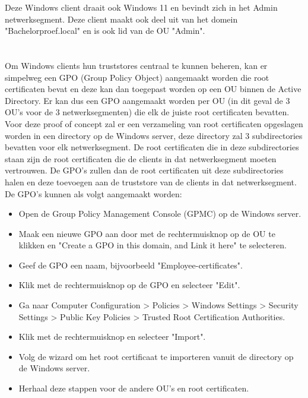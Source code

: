Deze Windows client draait ook Windows 11 en bevindt zich in het Admin netwerksegment. Deze client maakt ook deel uit van het domein "Bachelorproef.local" en is ook lid van de OU "Admin".

\section{}%
\label{sec:Eerste_oplossing}
\subsection{}
\label{subsec:Oplossing_voor_Windows_end-points_door_middel_van_GPOs_met_root_certificaten}
Om Windows clients hun truststores centraal te kunnen beheren, kan er simpelweg een GPO (Group Policy Object) aangemaakt worden die root certificaten bevat en deze kan dan toegepast worden op een OU binnen de Active Directory.
Er kan dus een GPO aangemaakt worden per OU (in dit geval de 3 OU's voor de 3 netwerksegmenten) die elk de juiste root certificaten bevatten.
Voor deze proof of concept zal er een verzameling van root certificaten opgeslagen worden in een directory op de Windows server, deze directory zal 3 subdirectories bevatten voor elk netwerksegment. De root certificaten die in deze subdirectories staan zijn de root certificaten die de clients in dat netwerksegment moeten vertrouwen.
De GPO's zullen dan de root certificaten uit deze subdirectories halen en deze toevoegen aan de truststore van de clients in dat netwerksegment.
De GPO's kunnen als volgt aangemaakt worden:
\begin{itemize}
    \item Open de Group Policy Management Console (GPMC) op de Windows server.
    \item Maak een nieuwe GPO aan door met de rechtermuisknop op de OU te klikken en "Create a GPO in this domain, and Link it here" te selecteren.
    \item Geef de GPO een naam, bijvoorbeeld "Employee-certificates".
    \item Klik met de rechtermuisknop op de GPO en selecteer "Edit".
    \item Ga naar Computer Configuration > Policies > Windows Settings > Security Settings > Public Key Policies > Trusted Root Certification Authorities.
    \item Klik met de rechtermuisknop en selecteer "Import".
    \item Volg de wizard om het root certificaat te importeren vanuit de directory op de Windows server.
    \item Herhaal deze stappen voor de andere OU's en root certificaten.
\end{itemize}


